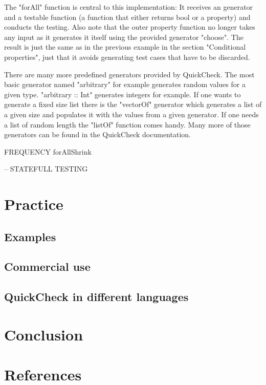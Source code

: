 \documentclass[a4paper, 12pt]{article} %
\begin{document}
The "forAll" function is central to this implementation: It receives an generator and a testable function (a function that either returns bool or a property) and conducts the testing. Also note that the outer property function no longer takes any input as it generates it itself using the provided generator "choose". The result is just the same as in the previous example in the section "Conditional properties", just that it avoids generating test cases that have to be discarded.

There are many more predefined generators provided by QuickCheck. The most basic generator named "arbitrary" for example generates random values for a given type. "arbitrary :: Int" generates integers for example. If one wants to generate a fixed size list there is the "vectorOf" generator which generates a list of a given size and populates it with the values from a given generator. If one needs a list of random length the "listOf" function comes handy. Many more of those generators can be found in the QuickCheck documentation. \cite{documentation}

FREQUENCY
forAllShrink

-- STATEFULL TESTING

\section{Practice}

\subsection{Examples}

\subsection{Commercial use}

\subsection{QuickCheck in different languages}

\section{Conclusion}

\newpage
\section{References}
\printbibliography[heading=none]
\end{document}
